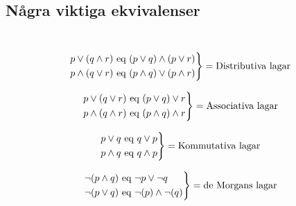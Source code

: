 \subsection{Några viktiga ekvivalenser}\hfill\\

\begin{equation*}
  \begin{gathered}
    \begin{rcases*}
      p\vee(q\wedge r)$ eq $(p\vee q)\wedge(p\vee r)\\
      p\wedge(q\vee r)$ eq $(p\wedge q)\vee(p\wedge r)
    \end{rcases*}=\text{Distributiva lagar}
  \end{gathered}
\end{equation*}
\par\bigskip

\begin{equation*}
  \begin{gathered}
    \begin{rcases*}
      p\vee(q\vee r)$ eq $(p\vee q)\vee r\\
      p\wedge(q\wedge r)$ eq $(p\wedge q)\wedge r
    \end{rcases*}=\text{Associativa lagar}
  \end{gathered}
\end{equation*}
\par\bigskip

\begin{equation*}
  \begin{gathered}
    \begin{rcases*}
      p\vee q \text{ eq } q\vee p\\
      p\wedge q \text{ eq } q\wedge p
    \end{rcases*}=\text{Kommutativa lagar}
  \end{gathered}
\end{equation*}
\par\bigskip

\begin{equation*}
  \begin{gathered}
    \begin{rcases*}
      \neg(p\wedge q) \text{ eq } \neg p \vee\neg q\\
      \neg(p\vee q) \text{ eq } \neg(p)\wedge \neg(q)
    \end{rcases*}=\text{de Morgans lagar}
  \end{gathered}
\end{equation*}
\par\bigskip

